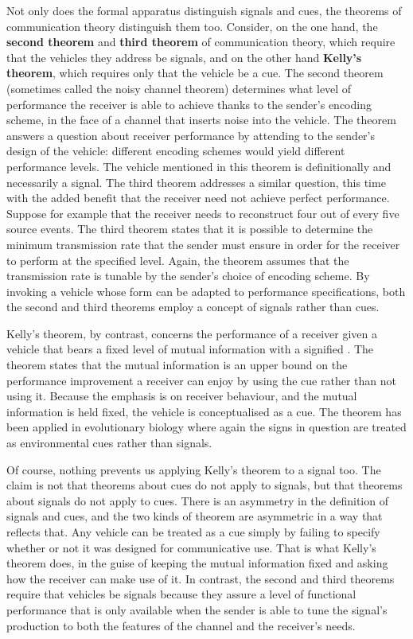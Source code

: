 Not only does the formal apparatus distinguish signals and cues, the theorems of communication theory distinguish them too.
Consider, on the one hand, the \textbf{second theorem} and \textbf{third theorem} of communication theory, which require that the vehicles they address be signals, and on the other hand \textbf{Kelly's theorem}, which requires only that the vehicle be a cue.
The second theorem (sometimes called the noisy channel theorem) determines what level of performance the receiver is able to achieve thanks to the sender's encoding scheme, in the face of a channel that inserts noise into the vehicle.
The theorem answers a question about receiver performance by attending to the sender's design of the vehicle: different encoding schemes would yield different performance levels.
The vehicle mentioned in this theorem is definitionally and necessarily a signal.
The third theorem addresses a similar question, this time with the added benefit that the receiver need not achieve perfect performance.
Suppose for example that the receiver needs to reconstruct four out of every five source events.
The third theorem states that it is possible to determine the minimum transmission rate that the sender must ensure in order for the receiver to perform at the specified level.
Again, the theorem assumes that the transmission rate is tunable by the sender's choice of encoding scheme.
By invoking a vehicle whose form can be adapted to performance specifications, both the second and third theorems employ a concept of signals rather than cues.

Kelly's theorem, by contrast, concerns the performance of a receiver given a vehicle that bears a fixed level of mutual information with a signified \citep{kelly1956new}.
The theorem states that the mutual information is an upper bound on the performance improvement a receiver can enjoy by using the cue rather than not using it.
Because the emphasis is on receiver behaviour, and the mutual information is held fixed, the vehicle is conceptualised as a cue.
The theorem has been applied in evolutionary biology \citep{donaldson-matasci2010fitness} where again the signs in question are treated as environmental cues rather than signals.

Of course, nothing prevents us applying Kelly's theorem to a signal too.
The claim is not that theorems about cues do not apply to signals, but that theorems about signals do not apply to cues.
There is an asymmetry in the definition of signals and cues, and the two kinds of theorem are asymmetric in a way that reflects that.
Any vehicle can be treated as a cue simply by failing to specify whether or not it was designed for communicative use.
That is what Kelly's theorem does, in the guise of keeping the mutual information fixed and asking how the receiver can make use of it.
In contrast, the second and third theorems require that vehicles be signals because they assure a level of functional performance that is only available when the sender is able to tune the signal's production to both the features of the channel and the receiver's needs.

